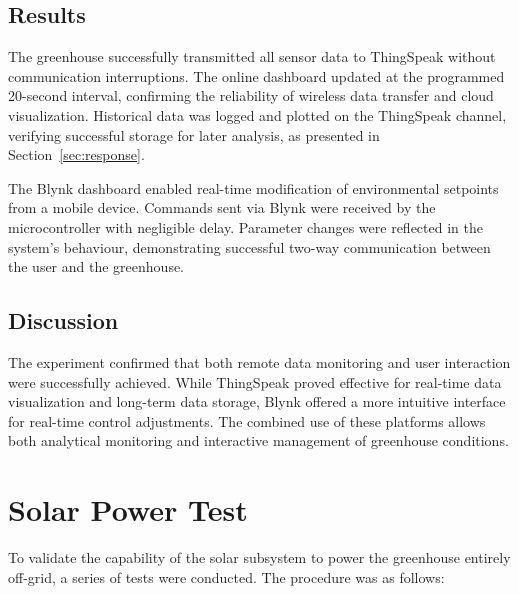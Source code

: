 \subsection{Results}
The greenhouse successfully transmitted all sensor data to ThingSpeak without communication interruptions. The online dashboard updated at the programmed 20-second interval, confirming the reliability of wireless data transfer and cloud visualization. Historical data was logged and plotted on the ThingSpeak channel, verifying successful storage for later analysis, as presented in Section~\ref{sec:response}.
 
The Blynk dashboard enabled real-time modification of environmental setpoints from a mobile device. Commands sent via Blynk were received by the microcontroller with negligible delay. Parameter changes were reflected in the system's behaviour, demonstrating successful two-way communication between the user and the greenhouse.


\subsection{Discussion}
The experiment confirmed that both remote data monitoring and user interaction were successfully achieved. While ThingSpeak proved effective for real-time data visualization and long-term data storage, Blynk offered a more intuitive interface for real-time control adjustments. The combined use of these platforms allows both analytical monitoring and interactive management of greenhouse conditions.

\section{Solar Power Test}

To validate the capability of the solar subsystem to power the greenhouse entirely off-grid, a series of tests were conducted. The procedure was as follows:

